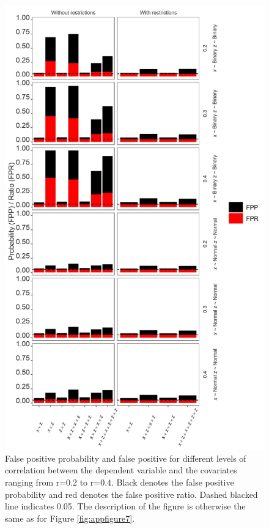 \begin{figure}[hbt!]
\includegraphics[scale=0.7]{R/Analysis/Result/Figures/Figure2SIBon.jpeg}
\centering
\caption{False positive probability and false positive for different levels of correlation between the dependent variable and the covariates ranging from r=0.2 to r=0.4. Black denotes the false positive probability and red denotes the false positive ratio. Dashed blacked line indicates 0.05. The description of the figure is otherwise the same as for Figure \ref{fig:appfigure7}.}
\label{fig:appfigure8}
\end{figure}


